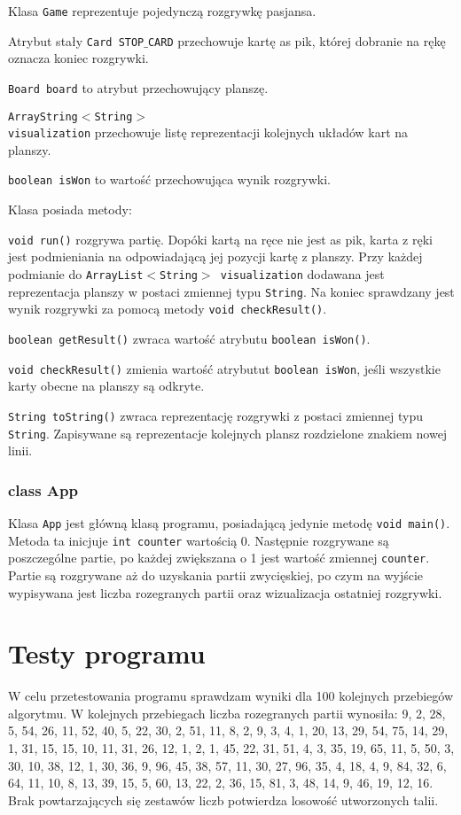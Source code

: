 \documentclass{article}
\begin{document}
Klasa \texttt{Game} reprezentuje pojedynczą rozgrywkę pasjansa.

Atrybut stały \texttt{Card STOP$\_$CARD} przechowuje kartę as pik, której dobranie na rękę oznacza koniec rozgrywki.

\texttt{Board board} to atrybut przechowujący planszę.

\texttt{ArrayString$<$String$>$\\visualization} przechowuje listę reprezentacji kolejnych układów kart na planszy.

\texttt{boolean isWon} to wartość przechowująca wynik rozgrywki.

Klasa posiada metody:

\texttt{void run()} rozgrywa partię. Dopóki kartą na ręce nie jest as pik, karta z ręki jest podmieniania na odpowiadającą jej pozycji kartę z planszy. Przy każdej podmianie do \texttt{ArrayList$<$String$>$ visualization} dodawana jest reprezentacja planszy w postaci zmiennej typu \texttt{String}. Na koniec sprawdzany jest wynik rozgrywki za pomocą metody \texttt{void checkResult()}.

\texttt{boolean getResult()} zwraca wartość atrybutu \texttt{boolean isWon()}.

\texttt{void checkResult()} zmienia wartość atrybutut \texttt{boolean isWon}, jeśli wszystkie karty obecne na planszy są odkryte.

\texttt{String toString()} zwraca reprezentację rozgrywki z postaci zmiennej typu \texttt{String}. Zapisywane są reprezentacje kolejnych plansz rozdzielone znakiem nowej linii.

\subsubsection*{class App}

Klasa \texttt{App} jest główną klasą programu, posiadającą jedynie metodę \texttt{void main()}. Metoda ta inicjuje \texttt{int counter} wartością 0. Następnie rozgrywane są poszczególne partie, po każdej zwiększana o 1 jest wartość zmiennej \texttt{counter}. Partie są rozgrywane aż do uzyskania partii zwycięskiej, po czym na wyjście wypisywana jest liczba rozegranych partii oraz wizualizacja ostatniej rozgrywki.

\section{Testy programu}

W celu przetestowania programu sprawdzam wyniki dla 100 kolejnych przebiegów algorytmu. W kolejnych przebiegach liczba rozegranych partii wynosiła: 
9, 2, 28, 5, 54, 26, 11, 52, 40, 5, 22, 30, 2, 51, 11, 8, 2, 9, 3, 4, 1, 20, 13, 29, 54, 75, 14, 29, 1, 31, 15, 15, 10, 11, 31, 26, 12, 1, 2, 1, 45, 22, 31, 51, 4, 3, 35, 19, 65, 11, 5, 50, 3, 30, 10, 38, 12, 1, 30, 36, 9, 96, 45, 38, 57, 11, 30, 27, 96, 35, 4, 18, 4, 9, 84, 32, 6, 64, 11, 10, 8, 13, 39, 15, 5, 60, 13, 22, 2, 36, 15, 81, 3, 48, 14, 9, 46, 19, 12, 16.
Brak powtarzających się zestawów liczb potwierdza losowość utworzonych talii.
\end{document}
